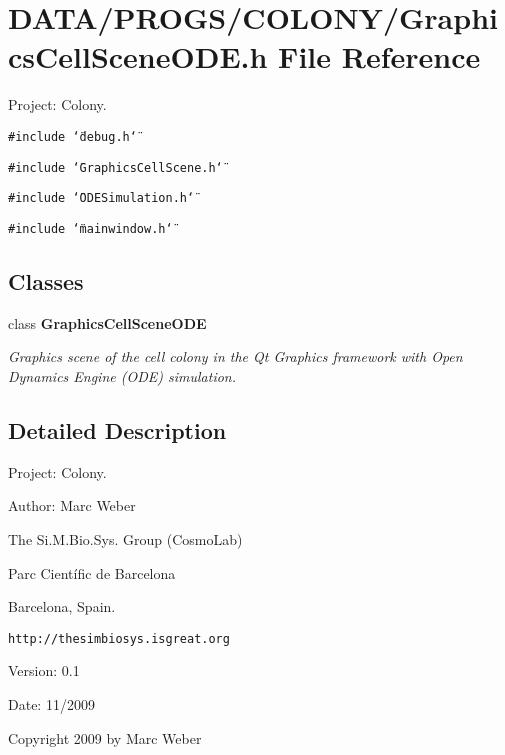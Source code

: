 \section{DATA/PROGS/COLONY/GraphicsCellSceneODE.h File Reference}
\label{GraphicsCellSceneODE_8h}
Project: Colony. 

{\tt \#include \char`\"{}debug.h\char`\"{}}\par
{\tt \#include \char`\"{}GraphicsCellScene.h\char`\"{}}\par
{\tt \#include \char`\"{}ODESimulation.h\char`\"{}}\par
{\tt \#include \char`\"{}mainwindow.h\char`\"{}}\par
\subsection*{Classes}
\begin{CompactItemize}
\item 
class {\bf GraphicsCellSceneODE}
\begin{CompactList}\small\item\em Graphics scene of the cell colony in the Qt Graphics framework with Open Dynamics Engine (ODE) simulation. \item\end{CompactList}\end{CompactItemize}


\subsection{Detailed Description}
Project: Colony. 

\begin{Desc}
\item[Author:]Marc Weber\par
 The Si.M.Bio.Sys. Group (CosmoLab)\par
 Parc Científic de Barcelona\par
 Barcelona, Spain.\par
 {\tt http://thesimbiosys.isgreat.org} \end{Desc}
\begin{Desc}
\item[Version:]0.1 \end{Desc}
\begin{Desc}
\item[Date:]11/2009\end{Desc}
Copyright 2009 by Marc Weber 